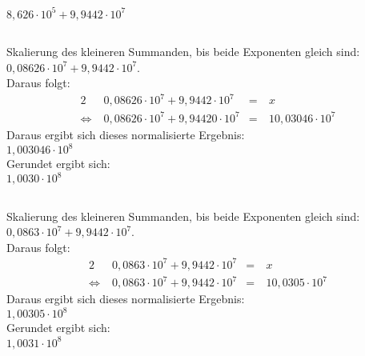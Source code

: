 \documentclass[10pt,a4paper,oneside,ngerman,numbers=noenddot]{scrartcl}
\begin{document}
\subsection{}
\section{}%
$8,626 \cdot 10^{5} + 9,9442 \cdot 10^{7}$\\

\subsection{}
Skalierung des kleineren Summanden, bis beide Exponenten gleich sind:
$0,08626 \cdot 10^{7} + 9,9442 \cdot 10^{7}$.\\
Daraus folgt:
\begin{alignat}{2}
&\; 0,08626 \cdot 10^{7} + 9,9442 \cdot 10^{7} &=&\: x\\
\Leftrightarrow &\; 0,08626 \cdot 10^{7} + 9,94420 \cdot 10^{7} &=&\: 10,03046 \cdot 10^{7}
\end{alignat}
Daraus ergibt sich dieses normalisierte Ergebnis:\\
$1,003046 \cdot 10^{8}$\\
Gerundet ergibt sich:\\
$1,0030 \cdot 10^{8}$\\
\subsection{}
Skalierung des kleineren Summanden, bis beide Exponenten gleich sind:
$0,0863 \cdot 10^{7} + 9,9442 \cdot 10^{7}$.\\
Daraus folgt:
\begin{alignat}{2}
&\; 0,0863 \cdot 10^{7} + 9,9442 \cdot 10^{7} &=&\: x\\
\Leftrightarrow &\; 0,0863 \cdot 10^{7} + 9,9442 \cdot 10^{7} &=&\: 10,0305 \cdot 10^{7}
\end{alignat}
Daraus ergibt sich dieses normalisierte Ergebnis:\\
$1,00305 \cdot 10^{8}$\\
Gerundet ergibt sich:\\
$1,0031 \cdot 10^{8}$\\
\end{document}

